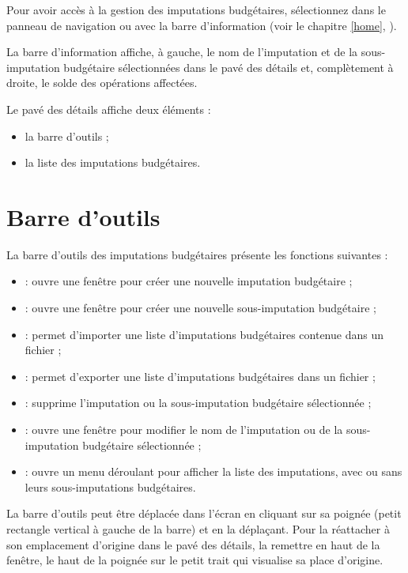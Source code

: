 Pour avoir accès à la gestion des imputations budgétaires, sélectionnez  dans le panneau de navigation ou avec la barre d'information (voir le chapitre \vref{home}, ).

La barre d'information affiche, à gauche, le nom de l'imputation et de la sous-imputation budgétaire sélectionnées dans le pavé des détails et, complètement à droite, le solde des opérations affectées.

Le pavé des détails affiche deux éléments :
\begin{itemize}
	 \item la barre d'outils ;
	 \item la liste des imputations budgétaires.
\end{itemize}


\section{Barre d'outils\label{budgetarylines-functions}}


La barre d'outils des imputations budgétaires présente les fonctions suivantes :

\begin{itemize}
	 \item {} : ouvre une fenêtre pour créer une nouvelle imputation budgétaire ;
	 \item {} : ouvre une fenêtre pour créer une nouvelle sous-imputation budgétaire ;
	 \item {} : permet d'importer une liste d'imputations budgétaires contenue dans un fichier ;
	 \item {} : permet d'exporter une liste d'imputations budgétaires dans un fichier ;
	 \item {} : supprime l'imputation ou la sous-imputation budgétaire sélectionnée ;
	 \item {} : ouvre une fenêtre pour modifier le nom de l'imputation ou de la sous-imputation budgétaire sélectionnée ;
	 \item {} : ouvre un menu déroulant pour afficher la liste des 	imputations, avec ou sans leurs sous-imputations budgétaires.
\end{itemize}

La barre d'outils peut être déplacée dans l'écran en cliquant sur sa poignée (petit rectangle vertical à gauche de la barre) et en la déplaçant. Pour la réattacher à son emplacement d'origine dans le pavé des détails, la remettre en haut de la fenêtre, le haut de la poignée sur le petit trait qui visualise sa place d'origine.


